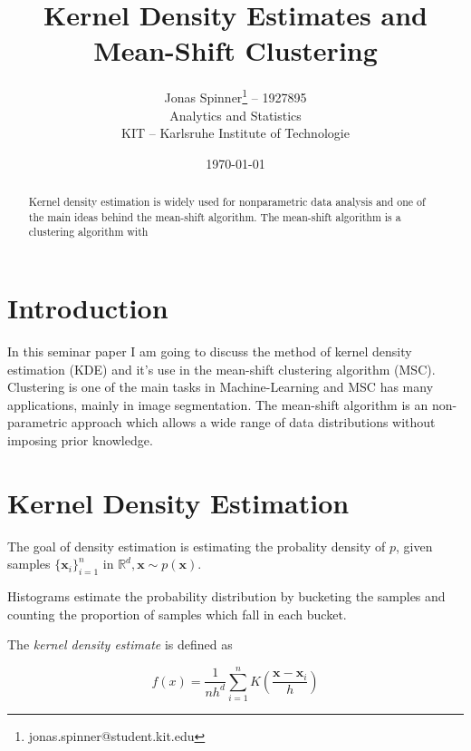 \documentclass{article}
\begin{document}
\title{Kernel Density Estimates and Mean-Shift Clustering}
\author{Jonas Spinner\thanks{jonas.spinner@student.kit.edu} -- 1927895\\
	Analytics and Statistics\\
	KIT -- Karlsruhe Institute of Technologie}
\date{\today}
\maketitle

\newpage

\tableofcontents

\newpage


\begin{abstract}
Kernel density estimation is widely used for nonparametric data analysis and one of the main ideas behind the mean-shift algorithm. The mean-shift algorithm is a clustering algorithm with 
\end{abstract}

\section{Introduction}

In this seminar paper I am going to discuss the method of kernel density estimation (KDE) and it's use in the mean-shift clustering algorithm (MSC). Clustering is one of the main tasks in Machine-Learning and MSC has many applications, mainly in image segmentation. The mean-shift algorithm is an non-parametric approach which allows a wide range of data distributions without imposing prior knowledge.


\section{Kernel Density Estimation}


The goal of density estimation is estimating the probality density of $p$, given samples $\{\bm{x}_i\}_{i=1}^n$ in $\mathbb{R}^d, \bm{x} \sim p(\bm{x})$.


Histograms estimate the probability distribution by bucketing the samples and counting the proportion of samples which fall in each bucket.

The \textit{kernel density estimate} is defined as

\[
f(x) = \frac{1}{nh^d} \sum_{i=1}^n K\left(\frac{\bm{x} - \bm{x}_i}{h} \right)
\]
\end{document}
